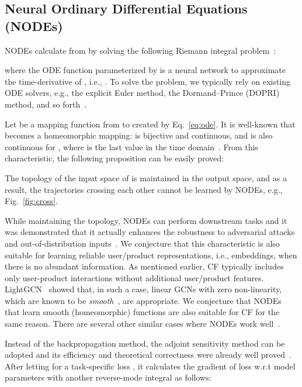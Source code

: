 \documentclass[sigconf]{acmart}
\begin{document}
\subsection{Neural Ordinary Differential Equations (NODEs)} NODEs calculate  from  by solving the following Riemann integral problem~\cite{NIPS2018_7892}:
\begin{linenomath*}\end{linenomath*}where the ODE function  parameterized by  is a neural network to approximate the time-derivative of , i.e., . To solve the problem, we typically rely on existing ODE solvers, e.g., the explicit Euler method, the Dormand--Prince (DOPRI) method, and so forth~\cite{DORMAND198019}.

Let  be a mapping function from  to  created by Eq.~\eqref{eq:ode}. It is well-known that  becomes a homeomorphic mapping:  is bijective and continuous, and  is also continuous for , where  is the last value in the time domain~\cite{NIPS2019_8577,massaroli2020dissecting}. From this characteristic, the following proposition can be easily proved:
\begin{proposition}\label{p:hom}
The topology of the input space of  is maintained in the output space, and as a result, the trajectories crossing each other cannot be learned by NODEs, e.g., Fig.~\ref{fig:cross}.
\end{proposition}

 While maintaining the topology, NODEs can perform downstream tasks and it was demonstrated that it actually enhances the robustness to adversarial attacks and out-of-distribution inputs~\cite{yan2020robustness}. We conjecture that this characteristic is also suitable for learning reliable user/product representations, i.e., embeddings, when there is no abundant information. As mentioned earlier, CF typically includes only user-product interactions without additional user/product features. LightGCN~\cite{10.1145/3397271.3401063} showed that, in such a case, linear GCNs with zero non-linearity, which are known to be \emph{smooth}~\cite{Chen_Lin_Li_Li_Zhou_Sun_2020}, are appropriate. We conjecture that NODEs that learn smooth (homeomorphic) functions are also suitable for CF for the same reason. There are several other similar cases where NODEs work well~\cite{kim2021oct,jhin2021acenode,lightmove}.



Instead of the backpropagation method, the adjoint sensitivity method can be adopted and its efficiency and theoretical correctness were already well proved~\cite{NIPS2018_7892}. After letting  for a task-specific loss , it calculates the gradient of loss w.r.t model parameters with another reverse-mode integral as follows:
\end{document}
